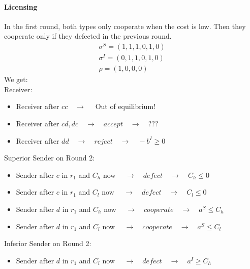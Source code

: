 \documentclass[11pt]{article}
\theoremstyle{plainCl1}
\begin{document}
\paragraph{Licensing} 
In the first round, both types only cooperate when the cost is low. Then they cooperate only if they defected in the previous round. 
	\begin{equation}\label{strategies}
	\begin{array}{l}	
	\sigma^S = (1, 1, 1, 0, 1, 0)\\
	\sigma^I = (0, 1, 1, 0, 1, 0)\\
	\rho = (1, 0, 0, 0)
	\end{array}
	\end{equation}
We get:\\
Receiver:
\begin{itemize} [noitemsep]
	\item Receiver after $cc \quad \rightarrow \quad$ Out of equilibrium!\\
	\item Receiver after $cd, dc \quad \rightarrow \quad accept \quad \rightarrow \quad ???$\\
	\item Receiver after $dd \quad \rightarrow \quad reject \quad \rightarrow \quad -b^I \geq 0$\\
\end{itemize}
Superior Sender on Round 2:
\begin{itemize} [noitemsep]
	\item Sender after $c$ in $r_1$ and $C_h$ now $\quad \rightarrow \quad defect \quad \rightarrow \quad C_h \leq 0$\\
	\item Sender after $c$ in $r_1$ and $C_l$ now $\quad \rightarrow \quad defect \quad \rightarrow \quad C_l \leq 0$\\
	\item Sender  after $d$ in $r_1$ and $C_h$ now $\quad \rightarrow \quad cooperate \quad \rightarrow \quad a^S \leq C_h$\\
	\item Sender  after $d$ in $r_1$ and $C_l$ now $\quad \rightarrow \quad cooperate \quad \rightarrow \quad a^S \leq C_l$\\
\end{itemize}
Inferior Sender on Round 2:
\begin{itemize} [noitemsep]
	\item Sender  after $d$ in $r_1$ and $C_l$ now $\quad \rightarrow \quad defect \quad \rightarrow \quad a^I \geq C_h$\\
\end{itemize}
\end{document}
